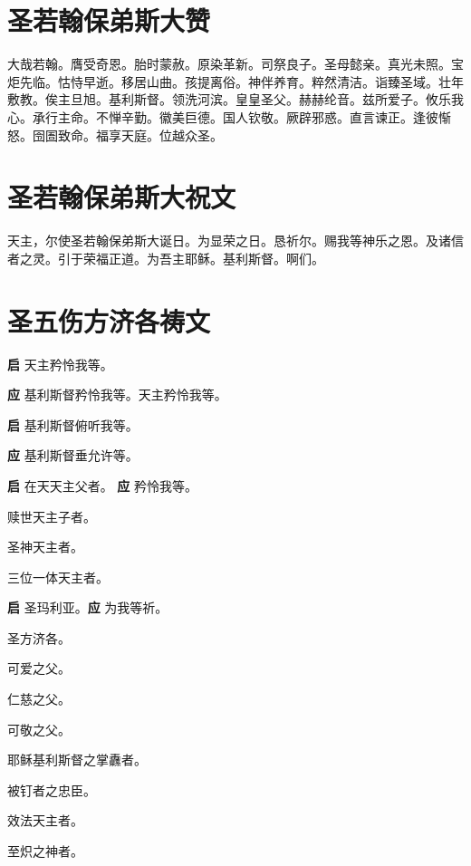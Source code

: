 \documentclass[UTF8,17pt]{ctexart}
\begin{document}
\section{圣若翰保弟斯⼤赞}

⼤哉若翰。膺受奇恩。胎时蒙赦。原染⾰新。司祭良⼦。圣母懿亲。真光未照。宝炬先临。怙恃早逝。移居⼭曲。孩提离俗。神伴养育。粹然清洁。诣臻圣域。壮年敷教。俟主旦旭。基利斯督。领洗河滨。皇皇圣⽗。赫赫纶⾳。兹所爱⼦。攸乐我⼼。承⾏主命。不惮⾟勤。徽美巨德。国⼈钦敬。厥辟邪惑。直⾔谏正。逢彼惭怒。囹圄致命。福享天庭。位越众圣。

\section{圣若翰保弟斯⼤祝⽂}

天主，尔使圣若翰保弟斯⼤诞⽇。为显荣之⽇。恳祈尔。赐我等神乐之恩。及诸信者之灵。引于荣福正道。为吾主耶稣。基利斯督。啊们。

\section{圣五伤方济各祷文}

\textbf{启} \quad 天主矜怜我等。

\textbf{应} \quad 基利斯督矜怜我等。天主矜怜我等。

\textbf{启} \quad 基利斯督俯听我等。

\textbf{应} \quad 基利斯督垂允许等。

\textbf{启} \quad 在天天主⽗者。 \hfill \textbf{应} \quad 矜怜我等。

 赎世天主⼦者。

 圣神天主者。

 三位⼀体天主者。

\textbf{启} \quad 圣玛利亚。\hfill \textbf{应} \quad 为我等祈。

 圣⽅济各。

 可爱之⽗。

 仁慈之⽗。

 可敬之⽗。

 耶稣基利斯督之掌纛者。

 被钉者之忠⾂。

 效法天主者。

 ⾄炽之神者。
\end{document}

